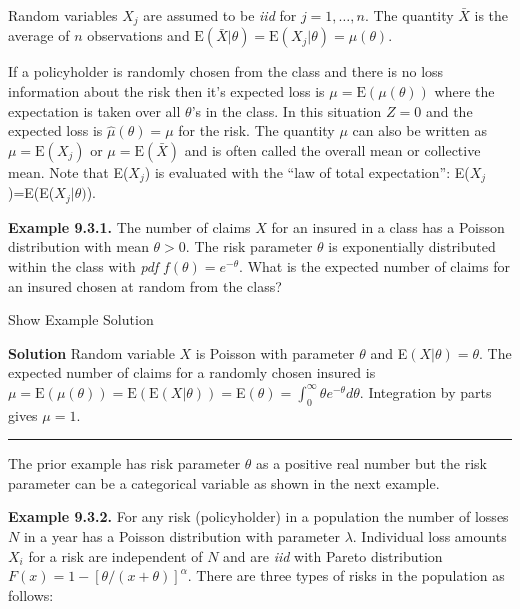 \documentclass[]{book}
\theoremstyle{definition}
\theoremstyle{definition}
\theoremstyle{definition}
\theoremstyle{remark}
\begin{document}
Random variables \(X_j\) are assumed to be \emph{iid} for
\(j=1,\ldots,n\). The quantity \(\bar{X}\) is the average of \(n\)
observations and
\(\mathrm{E}(\bar{X}|\theta)=\mathrm{E}(X_j|\theta)=\mu(\theta)\).

If a policyholder is randomly chosen from the class and there is no loss
information about the risk then it's expected loss is
\(\mu=\mathrm{E}(\mu(\theta))\) where the expectation is taken over all
\(\theta\)'s in the class. In this situation \(Z=0\) and the expected
loss is \(\hat\mu(\theta)=\mu\) for the risk. The quantity \(\mu\) can
also be written as \(\mu=\mathrm{E}(X_j)\) or
\(\mu=\mathrm{E}(\bar{X})\) and is often called the overall mean or
collective mean. Note that E(\(X_j\)) is evaluated with the ``law of
total expectation'': E(\(X_j\))=E(E(\(X_j|\theta)\)).

\textbf{Example 9.3.1.} The number of claims \(X\) for an insured in a
class has a Poisson distribution with mean \(\theta>0\). The risk
parameter \(\theta\) is exponentially distributed within the class with
\emph{pdf} \(f(\theta)=e^{-\theta}\). What is the expected number of
claims for an insured chosen at random from the class?

Show Example Solution

\hypertarget{toggleExampleCred.3.1}{}
\textbf{Solution} Random variable \(X\) is Poisson with parameter
\(\theta\) and E\((X|\theta)=\theta\). The expected number of claims for
a randomly chosen insured is
\(\mu=\mathrm{E}(\mu(\theta))=\mathrm{E}(\mathrm{E}(X|\theta))=\)E\((\theta)=\int_{0}^{\infty}\theta e^{-\theta} d\theta\).
Integration by parts gives \(\mu=1\).

\begin{center}\rule{0.5\linewidth}{\linethickness}\end{center}

The prior example has risk parameter \(\theta\) as a positive real
number but the risk parameter can be a categorical variable as shown in
the next example.

\textbf{Example 9.3.2.} For any risk (policyholder) in a population the
number of losses \(N\) in a year has a Poisson distribution with
parameter \(\lambda\). Individual loss amounts \(X_i\) for a risk are
independent of \(N\) and are \emph{iid} with Pareto distribution
\(F(x)=1-[\theta/(x+\theta)]^{\alpha}\). There are three types of risks
in the population as follows:
\end{document}
